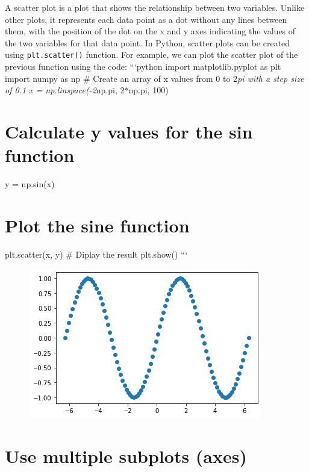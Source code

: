 \documentclass[11pt]{article}
\begin{document}
A scatter plot is a plot that shows the relationship between two
variables. Unlike other plots, it represents each data point as a dot
without any lines between them, with the position of the dot on the x
and y axes indicating the values of the two variables for that data
point. In Python, scatter plots can be created using
\texttt{plt.scatter()} function. For example, we can plot the scatter
plot of the previous function using the code: ```python import
matplotlib.pyplot as plt import numpy as np \# Create an array of x
values from 0 to 2\emph{pi with a step size of 0.1 x =
np.linspace(-2}np.pi, 2*np.pi, 100)

\hypertarget{calculate-y-values-for-the-sin-function}{%
\section{Calculate y values for the sin
function}\label{calculate-y-values-for-the-sin-function}}

y = np.sin(x)

\hypertarget{plot-the-sine-function}{%
\section{Plot the sine function}\label{plot-the-sine-function}}

plt.scatter(x, y) \# Diplay the result plt.show() ```

\begin{figure}
\centering
\includegraphics[scale=0.6]{scatter.png}
\end{figure}

\hypertarget{use-multiple-subplots-axes}{%
\section{Use multiple subplots
(axes)}\label{use-multiple-subplots-axes}}
\end{document}

